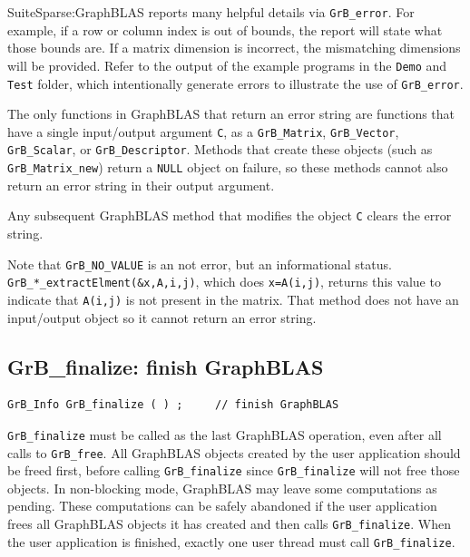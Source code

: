 SuiteSparse:GraphBLAS reports many helpful details via \verb'GrB_error'.  For
example, if a row or column index is out of bounds, the report will state what
those bounds are.  If a matrix dimension is incorrect, the mismatching
dimensions will be provided.  Refer to
the output of the example programs in the \verb'Demo' and \verb'Test' folder,
which intentionally generate errors to illustrate the use of \verb'GrB_error'.

The only functions in GraphBLAS that return an error string are functions that
have a single input/output argument \verb'C', as a \verb'GrB_Matrix',
\verb'GrB_Vector', \verb'GrB_Scalar', or \verb'GrB_Descriptor'. Methods that
create these objects (such as \verb'GrB_Matrix_new') return a \verb'NULL'
object on failure, so these methods cannot also return an error string in
their output argument.

Any subsequent GraphBLAS method that modifies the object \verb'C' clears the
error string.

Note that \verb'GrB_NO_VALUE' is an not error, but an informational status.
\verb'GrB_*_extractElment(&x,A,i,j)', which does \verb'x=A(i,j)', returns this
value to indicate that \verb'A(i,j)' is not present in the matrix.  That
method does not have an input/output object so it cannot return an error
string.

\subsection{{\sf GrB\_finalize:} finish GraphBLAS} %
\label{finalize}

\begin{mdframed}[userdefinedwidth=6in]
{\footnotesize
\begin{verbatim}
GrB_Info GrB_finalize ( ) ;     // finish GraphBLAS
\end{verbatim}
}\end{mdframed}

\verb'GrB_finalize' must be called as the last GraphBLAS operation, even after
all calls to \verb'GrB_free'.  All GraphBLAS objects created by the user
application should be freed first, before calling \verb'GrB_finalize' since
\verb'GrB_finalize' will not free those objects.  In non-blocking mode,
GraphBLAS may leave some computations as pending.  These computations can be
safely abandoned if the user application frees all GraphBLAS objects it has
created and then calls \verb'GrB_finalize'.  When the user application is
finished, exactly one user thread must call \verb'GrB_finalize'.

